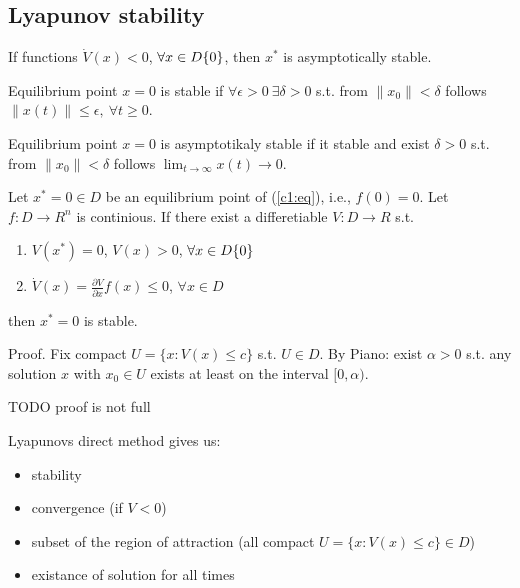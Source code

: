 \subsection{Lyapunov stability}

If functions $\dot V(x) < 0$, $\forall x \in D\\ \{0\}$, then $x^*$ is
asymptotically stable.

Equilibrium point $x=0$ is stable if $\forall \epsilon > 0\ \exists \delta > 0$
s.t. from $\|x_0\| < \delta$ follows $\|x(t)\| \le \epsilon, \ \forall t \ge 0$.

Equilibrium point $x=0$ is asymptotikaly stable if it stable and exist $\delta>0$
s.t. from $\|x_0\|<\delta$ follows 
$\lim_{t\rightarrow \infty}x(t) \rightarrow 0$.


Let $x^*=0 \in D$ be an equilibrium point of (\ref{c1:eq}), i.e., $f(0)=0.$ Let
$f: D \rightarrow R^n$ is continious. If there exist a differetiable 
$V:D\rightarrow R$ s.t. 
\begin{enumerate}
\item $V(x^*)=0$, $V(x)>0$, $\forall x \in D\\ \{0\}$
\item $\dot V(x) = \frac{\partial V}{\partial x}f(x) \le 0$, $\forall x \in D$
\end{enumerate}

then $x^*=0$ is stable.

Proof. Fix compact $U=\{x:V(x)\le c\}$ s.t. $U\in D$. By Piano: exist $\alpha > 0$
s.t. any solution $x$ with $x_0 \in U$ exists at least on the interval
$[0,\alpha)$.

TODO proof is not full


Lyapunovs direct method gives us:
\begin{itemize}
 \item stability
 \item convergence (if $V<0$)
 \item subset of the region of attraction (all compact $U=\{x:V(x)\le c\} \in D$)
 \item existance of solution for all times
\end{itemize}





 

